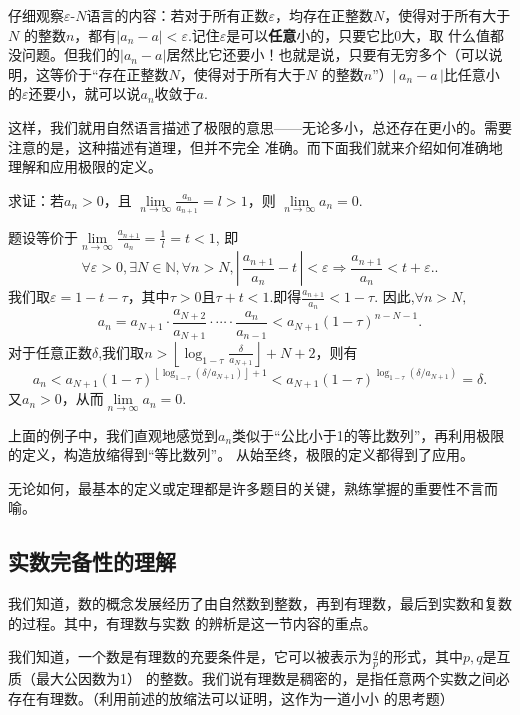 仔细观察$\varepsilon  \text{-}N$语言的内容：若对于所有正数$\varepsilon$，均存在正整数$N$，使得对于所有大于$N$
的整数$n$，都有$|a_n-a|<\varepsilon$.记住$\varepsilon$是可以\textbf{任意}小的，只要它比0大，取
什么值都没问题。但我们的$|a_n-a|$居然比它还要小！也就是说，只要有无穷多个（可以说明，这等价于“存在正整数$N$，使得对于所有大于$N$
的整数$n$”）$|\,a_n-a\,|$比任意小的$\varepsilon$还要小，就可以说$a_n$收敛于$a$.


这样，我们就用自然语言描述了极限的意思——无论多小，总还存在更小的。需要注意的是，这种描述有道理，但并不完全
准确。而下面我们就来介绍如何准确地理解和应用极限的定义。
\begin{example}
    求证：若$a_n>0$，且 $\lim\limits_{n \to \infty}\frac{a_n}{a_{n+1}}=l>1$，则 $\lim\limits_{n \to \infty}a_n=0$.
\end{example}
\begin{prove}
    题设等价于$\lim\limits_{n \to \infty}\frac{a_{n+1}}{a_n}=\frac{1}{l}=t<1$,
    即
    \[
        \forall \varepsilon>0,\exists N\in \mathbb{N},\forall n>N,\left|\, \frac{a_{n+1}}{a_n}-t\, \right| <\varepsilon
        \Rightarrow \frac{a_{n+1}}{a_n}<t+\varepsilon.
        .\]
    我们取$\varepsilon=1-t-\tau $，其中$\tau >0$且$\tau +t<1$.即得$\frac{a_{n+1}}{a_n}<1-\tau $.
    因此,$\forall n>N,$
    \[
        a_n=a_{N+1}\cdot \frac{a_{N+2}}{a_{N+1}}\cdot \cdots \cdot\frac{a_n}{a_{n-1}}<a_{N+1}(1-\tau)^{n-N-1}
        .\]
    对于任意正数$\delta$,我们取$n>\left\lfloor\log_{1-\tau}\frac{\delta}{\scriptstyle{a}_{{N+1}}}  \right\rfloor+N+2$，则有
    \[
        a_n<a_{N+1}(1-\tau)^{\left\lfloor \log_{1-\tau}(\delta / a_{N+1}) \right\rfloor+1}
        <a_{N+1}(1-\tau)^{\log_{1-\tau}(\delta / a_{N+1})}=\delta
        .\]
    又$a_n>0$，从而$\lim\limits_{n \to \infty}a_n=0$.
\end{prove}
上面的例子中，我们直观地感觉到$a_n$类似于“公比小于1的等比数列”，再利用极限的定义，构造放缩得到“等比数列”。
从始至终，极限的定义都得到了应用。


无论如何，最基本的定义或定理都是许多题目的关键，熟练掌握的重要性不言而喻。

\subsection{实数完备性的理解}
我们知道，数的概念发展经历了由自然数到整数，再到有理数，最后到实数和复数的过程。其中，有理数与实数
的辨析是这一节内容的重点。


我们知道，一个数是有理数的充要条件是，它可以被表示为$\frac{q}{p}$的形式，其中$p,q$是互质（最大公因数为1）
的整数。我们说有理数是稠密的，是指任意两个实数之间必存在有理数。（利用前述的放缩法可以证明，这作为一道小小
的思考题）



